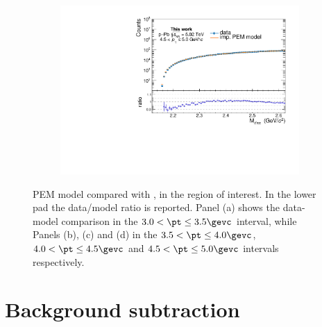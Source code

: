 \begin{appendices}
\begin{figure}[htb]
\begin{subfigure}{.5\textwidth}
  \caption{}
\end{subfigure}%
\begin{subfigure}{.5\textwidth}
  \centering
  \captionsetup{justification=centering}
  \includegraphics[width=\linewidth]{gfx/appendix/backsub/can_unblind9}
  \caption{}
\end{subfigure}
\caption{PEM model compared with \minv, in the region of interest. In the lower pad the data/model ratio is reported. Panel (a) shows the data-model comparison in the $3.0 < \pt \leq 3.5 \gevc$ interval, while Panels (b), (c) and (d) in the $3.5 < \pt \leq 4.0 \gevc$, $4.0 < \pt \leq 4.5 \gevc$ and $4.5 < \pt \leq 5.0 \gevc$ intervals respectively.}
\end{figure}
\clearpage

\section{Background subtraction} \label{app:bs2}

\end{appendices}